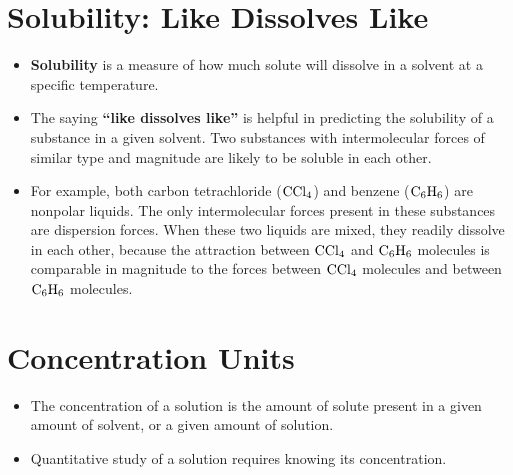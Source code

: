 \documentclass[a4paper,12pt,twocolumn]{article}
\begin{document}
\section{Solubility: Like Dissolves Like}
\begin{itemize}
\item \textbf{Solubility} is a measure of how much solute will dissolve in a solvent at a specific temperature. 
\item The saying \textbf{“like dissolves like”} is helpful in predicting the solubility of a substance in a given solvent. Two substances with intermolecular forces of similar type and magnitude are likely to be soluble in each other. 
\item For example, both carbon tetrachloride ($\ce{CCl4}$) and benzene ($\ce{C6H6}$) are nonpolar liquids. The only intermolecular forces present in these substances are dispersion forces. When these two liquids are mixed, they readily dissolve in each other, because the attraction between $\ce{CCl4}$ and $\ce{C6H6}$ molecules is comparable in magnitude to the forces between $\ce{CCl4}$ molecules and between $\ce{C6H6}$ molecules. 

\end{itemize}

\section{Concentration Units}
\begin{itemize}
\item The concentration of a solution is the amount of solute present in a given amount of solvent, or a given amount of solution.
\item Quantitative study of a solution requires knowing its concentration.
\end{itemize}
\end{document}
